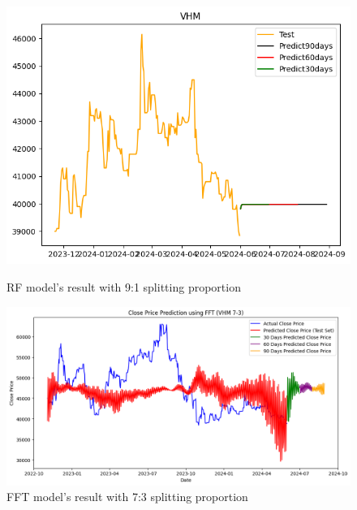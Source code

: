 \documentclass{ieeeojies}
\begin{document}
  \begin{figure}[H]
    \centering
    \begin{minipage}{0.23\textwidth}
    \centering
    \includegraphics[width=1\textwidth]{bibliography/Figure/VHMRF_9-1.png}
    \caption{RF model's result with 9:1 splitting proportion}
    \label{fig:1}
    \end{minipage}
    \hfill
    \begin{minipage}{0.23\textwidth}
    \centering
    \includegraphics[width=1\textwidth]{bibliography/Figure/FFT_VHM(7-3).png}
    \caption{FFT model's result with 7:3 splitting proportion}
    \label{fig:2}
    \end{minipage}
  \end{figure}
  
\end{document}
